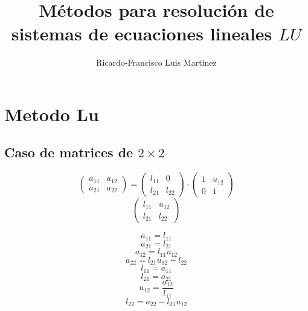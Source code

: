 \documentclass[10pt,a4paper,dvipdfmx]{article}
\title{M\'etodos para resoluci\'on de sistemas de ecuaciones lineales $LU$}
\author{Ricardo-Francisco Luis Mart\'inez}
\begin{document}
\maketitle
\tableofcontents
\newpage
\section{Metodo Lu}
\subsection{Caso de matrices de $2\times 2$ }
$$ \left( 
\begin{array}{cc}
a_{{1}{1}} & a_{{1}{2}} \\
a_{{2}{1}} & a_{{2}{2}} 
 \end{array}
\right)
 = \left( 
\begin{array}{cc}
l_{{1}{1}} & 0 \\
l_{{2}{1}} & l_{{2}{2}} 
 \end{array}
\right)
 \cdot \left( 
\begin{array}{cc}
1 & u_{{1}{2}} \\
0 & 1 
 \end{array}
\right)
 $$
$$ \left( 
\begin{array}{cc}
l_{{1}{1}} & u_{{1}{2}} \\
l_{{2}{1}} & l_{{2}{2}} 
 \end{array}
\right)
 $$
\begin{multicols}{2}
$$ a_{{1}{1}} = l_{{1}{1}} $$
$$ a_{{2}{1}} = l_{{2}{1}} $$
$$ a_{{1}{2}} = l_{{1}{1}} u_{{1}{2}} $$
$$ a_{{2}{2}} = l_{{2}{1}} u_{{1}{2}} + l_{{2}{2}} $$
\vfill\null
\columnbreak
$$ l_{{1}{1}} = a_{{1}{1}} $$
$$ l_{{2}{1}} = a_{{2}{1}} $$
$$ u_{{1}{2}} = \dfrac{a_{{1}{2}}}{l_{{1}{1}}} $$
$$ l_{{2}{2}} = a_{{2}{2}}- l_{{2}{1}} u_{{1}{2}} $$
\end{multicols}
\end{document}
